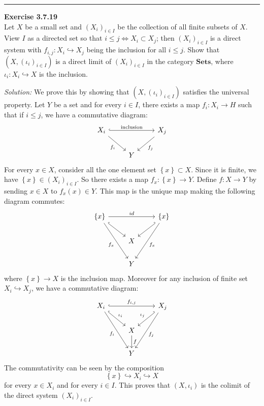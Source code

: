 \documentclass[a4paper, 12pt]{article}
\newenvironment{problem}[2][Exercise]
    { \begin{mdframed}[backgroundcolor=gray!20] \textbf{#1 #2} \\}
    {  \end{mdframed}}
\newenvironment{solution}
    {\textit{Solution:}}
    {}
\begin{document}
\noindent\rule{7in}{2.8pt}
\begin{problem}{3.7.19}
Let \(X\) be a small set and \((X_i)_{i\in I}\)	be the collection of all finite subsets of \(X\). View \(I\) as a directed set so that \(i\leq j\Leftrightarrow X_i\subset X_j\); then 
\((X_i)_{i\in I}\) is a direct system with \(f_{i,j}:X_i\hookrightarrow X_j\) being the inclusion for all \(i\leq j\). Show that \((X,(\iota_i)_{i\in I})\) is a direct limit of \((X_i)_{i\in I}\) 
in the category \(\mathbf{Sets}\), where \(\iota_i:X_i\hookrightarrow X\) is the inclusion.
\end{problem}
\begin{solution}
We prove this by showing that \((X,(\iota_i)_{i\in I})\) satisfies the universal property. Let \(Y\) be a set and for every \(i\in I\), there exists a map \(f_i:X_i\rightarrow H\) such that if \(i\leq j\), we have a commutative diagram: 
\[\begin{tikzcd}
	{X_i} && {X_j} \\
	& Y
	\arrow["{\text{inclusion}}", hook, from=1-1, to=1-3]
	\arrow["{f_i}"', from=1-1, to=2-2]
	\arrow["{f_j}", from=1-3, to=2-2]
\end{tikzcd}\]
For every \(x\in X\), consider all the one element set \(\left\{ x \right\}\subset X\). Since it is finite, we have \(\left\{ x \right\}\in (X_i)_{i\in I}\). So there exists a map \(f_x:\left\{ x \right\}\rightarrow Y\). Define \(f:X\rightarrow Y\) by sending 
\(x\in X\) to \(f_x(x)\in Y\). This map is the unique map making the following diagram commutes:
\[\begin{tikzcd}
	{\left\{x\right\}} && {\left\{x\right\}} \\
	& X \\
	& Y
	\arrow["id", from=1-1, to=1-3]
	\arrow[hook, from=1-1, to=2-2]
	\arrow["{f_x}"', from=1-1, to=3-2]
	\arrow[hook', from=1-3, to=2-2]
	\arrow["{f_x}", from=1-3, to=3-2]
\end{tikzcd}\]
where \(\left\{ x \right\}\rightarrow X\) is the inclusion map. Moreover for any inclusion of finite set \(X_i\hookrightarrow X_j\), we have a commutative diagram:
\[\begin{tikzcd}
	{X_i} && {X_j} \\
	& X \\
	& Y
	\arrow["{f_{i,j}}", hook, from=1-1, to=1-3]
	\arrow["{\iota_i}", hook, from=1-1, to=2-2]
	\arrow["{f_i}"', from=1-1, to=3-2]
	\arrow["{\iota_j}"', hook', from=1-3, to=2-2]
	\arrow["{f_j}", from=1-3, to=3-2]
	\arrow["f", from=2-2, to=3-2]
\end{tikzcd}\]
The commutativity can be seen by the composition 
\[\left\{ x \right\}\hookrightarrow X_i\hookrightarrow X\]
for every \(x\in X_i\) and for every \(i\in I\). This proves that \((X,\iota_i)\) is the colimit of the direct system \((X_i)_{i\in I}\).	
\end{solution}
\end{document}
